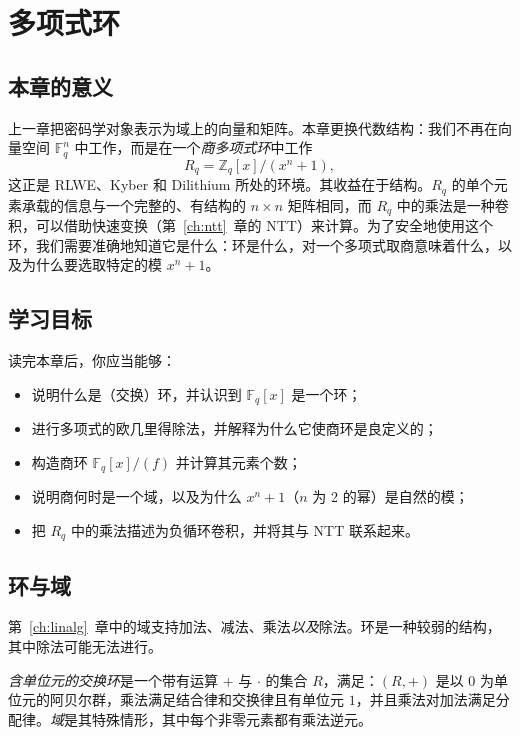 \chapter{多项式环}
\label{ch:polyring}

\section{本章的意义}
上一章把密码学对象表示为域上的向量和矩阵。本章更换代数结构：我们不再在向量空间 $\mathbb{F}_q^n$ 中工作，而是在一个\emph{商多项式环}中工作
\[
R_q = \mathbb{Z}_q[x]/(x^n+1),
\]
这正是 RLWE、Kyber 和 Dilithium 所处的环境。其收益在于结构。$R_q$ 的单个元素承载的信息与一个完整的、有结构的 $n\times n$ 矩阵相同，而 $R_q$ 中的乘法是一种卷积，可以借助快速变换（第~\ref{ch:ntt}~章的 NTT）来计算。为了安全地使用这个环，我们需要准确地知道它是什么：环是什么，对一个多项式取商意味着什么，以及为什么要选取特定的模 $x^n+1$。

\section{学习目标}
读完本章后，你应当能够：

\begin{itemize}
  \item 说明什么是（交换）环，并认识到 $\mathbb{F}_q[x]$ 是一个环；
  \item 进行多项式的欧几里得除法，并解释为什么它使商环是良定义的；
  \item 构造商环 $\mathbb{F}_q[x]/(f)$ 并计算其元素个数；
  \item 说明商何时是一个域，以及为什么 $x^n+1$（$n$ 为 2 的幂）是自然的模；
  \item 把 $R_q$ 中的乘法描述为负循环卷积，并将其与 NTT 联系起来。
\end{itemize}

\section{环与域}
第~\ref{ch:linalg}~章中的域支持加法、减法、乘法\emph{以及}除法。环是一种较弱的结构，其中除法可能无法进行。

\begin{definition}[交换环]
\emph{含单位元的交换环}是一个带有运算 $+$ 与 $\cdot$ 的集合 $R$，满足：$(R,+)$ 是以 $0$ 为单位元的阿贝尔群，乘法满足结合律和交换律且有单位元 $1$，并且乘法对加法满足分配律。\emph{域}是其特殊情形，其中每个非零元素都有乘法逆元。
\end{definition}

